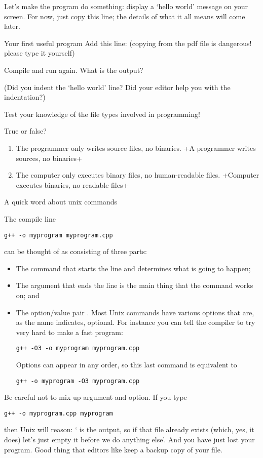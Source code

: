 Let's make the program do something:
display a `hello world' message on your screen.
For now, just copy this line; the details
of what it all means will come later.

\begin{exercise}{Your first useful program}
  \label{ex:sayhello}
Add this line:
%
%
(copying from the pdf file is dangerous! please type it yourself)

Compile and run again. What is the output? 

  (Did you indent the `hello world' line? Did your editor help you with
  the indentation?)
\end{exercise}

Test your knowledge of the file types involved in programming!

\begin{review}
  \label{q:compiler}
  True or false?
  \begin{enumerate}
  \item The programmer only writes source files, no binaries.
    \slackpollTF+A programmer writes sources, no binaries+
  \item The computer only executes binary files, no human-readable files.
    \slackpollTF+Computer executes binaries, no readable files+
  \end{enumerate}
\end{review}

 {A quick word about unix commands}

The compile line
\begin{verbatim}
g++ -o myprogram myprogram.cpp
\end{verbatim}
can be thought of as consisting of three parts:
\begin{itemize}
\item The command  that starts the line and determines what is
  going to happen;
\item The argument  that ends the line is the main
  thing that the command works on; and
\item The option/value pair . Most Unix commands have
  various options that are, as the name indicates, optional. For
  instance you can tell the compiler to try very hard to make a fast program:
\begin{verbatim}
g++ -O3 -o myprogram myprogram.cpp
\end{verbatim}
  Options can appear in any order, so this last command is equivalent to
\begin{verbatim}
g++ -o myprogram -O3 myprogram.cpp
\end{verbatim}
\end{itemize}
Be careful not to mix up argument and option. If you type
\begin{verbatim}
g++ -o myprogram.cpp myprogram
\end{verbatim}
then Unix will reason: ` is the output, so if that
file already exists (which, yes, it does) let's just empty it before
we do anything else'. And you have just lost your program.
Good thing that editors like
 keep a backup copy of your file.

